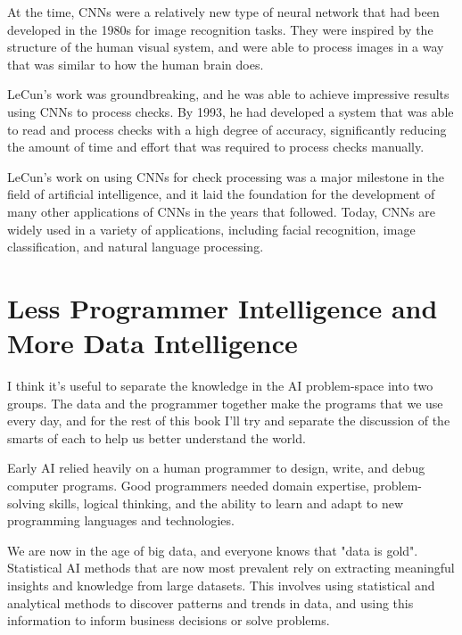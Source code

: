 At the time, CNNs were a relatively new type of neural network that had been developed in the 1980s for image recognition tasks. They were inspired by the structure of the human visual system, and were able to process images in a way that was similar to how the human brain does.

LeCun's work was groundbreaking, and he was able to achieve impressive results using CNNs to process checks. By 1993, he had developed a system that was able to read and process checks with a high degree of accuracy, significantly reducing the amount of time and effort that was required to process checks manually.

LeCun's work on using CNNs for check processing was a major milestone in the field of artificial intelligence, and it laid the foundation for the development of many other applications of CNNs in the years that followed. Today, CNNs are widely used in a variety of applications, including facial recognition, image classification, and natural language processing. 

\section{Less Programmer Intelligence and More Data Intelligence}

I think it's useful to separate the knowledge in the AI problem-space into two groups. The data and the programmer together make the programs that we use every day, and for the rest of this book I'll try and separate the discussion of the smarts of each to help us better understand the world. 

Early AI relied heavily on a human programmer to design, write, and debug computer programs. Good programmers needed domain expertise, problem-solving skills, logical thinking, and the ability to learn and adapt to new programming languages and technologies.

We are now in the age of big data, and everyone knows that "data is gold". Statistical AI methods that are now most prevalent rely on extracting meaningful insights and knowledge from large datasets. This involves using statistical and analytical methods to discover patterns and trends in data, and using this information to inform business decisions or solve problems. 

